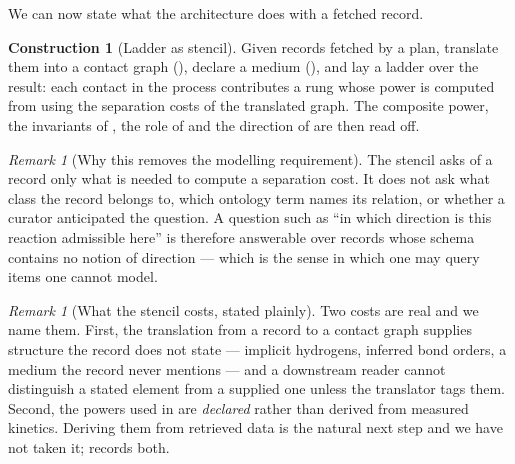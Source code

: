 \documentclass[11pt,twocolumn,a4paper]{article}
\theoremstyle{thmstyle}
\theoremstyle{definition}
\newtheorem{construction}[theorem]{Construction}
\theoremstyle{remark}
\newtheorem{remark}[theorem]{Remark}
\begin{document}
We can now state what the architecture does with a fetched record.

\begin{construction}[Ladder as stencil]
\label{con:stencil}
Given records fetched by a plan, translate them into a contact graph
(), declare a medium (), and lay a
ladder over the result: each contact in the process contributes a rung whose
power is computed from  using the separation costs of the
translated graph. The composite power, the invariants of
, the role of  and the direction of
 are then read off.
\end{construction}

\begin{remark}[Why this removes the modelling requirement]
\label{rem:nomodel}
The stencil asks of a record only what is needed to compute a separation cost.
It does not ask what class the record belongs to, which ontology term names its
relation, or whether a curator anticipated the question. A question such as
``in which direction is this reaction admissible here'' is therefore answerable
over records whose schema contains no notion of direction --- which is the
sense in which one may query items one cannot model.
\end{remark}

\begin{remark}[What the stencil costs, stated plainly]
\label{rem:stencil-honest}
Two costs are real and we name them. First, the translation from a record to a
contact graph supplies structure the record does not state --- implicit
hydrogens, inferred bond orders, a medium the record never mentions --- and a
downstream reader cannot distinguish a stated element from a supplied one
unless the translator tags them. Second, the powers used in
 are \emph{declared} rather than derived from measured
kinetics. Deriving them from retrieved data is the natural next step and we
have not taken it;  records both.
\end{remark}
\end{document}
